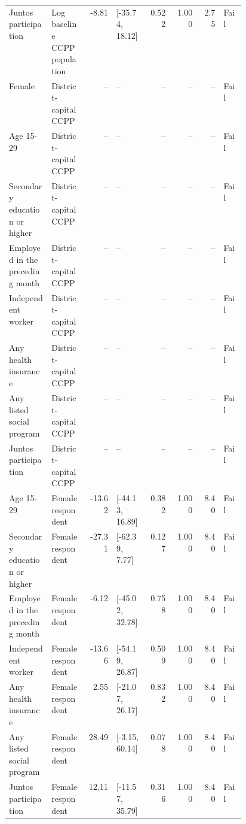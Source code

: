 \begin{longtable}{@{}p{0.18\linewidth}p{0.15\linewidth}rp{0.13\linewidth}rrrl@{}}
Juntos participation & Log baseline CCPP population & -8.81 & [-35.74, 18.12] & 0.522 & 1.000 & 2.75 & Fail \\
Female & District-capital CCPP & -- & -- & -- & -- & -- & Fail \\
Age 15-29 & District-capital CCPP & -- & -- & -- & -- & -- & Fail \\
Secondary education or higher & District-capital CCPP & -- & -- & -- & -- & -- & Fail \\
Employed in the preceding month & District-capital CCPP & -- & -- & -- & -- & -- & Fail \\
Independent worker & District-capital CCPP & -- & -- & -- & -- & -- & Fail \\
Any health insurance & District-capital CCPP & -- & -- & -- & -- & -- & Fail \\
Any listed social program & District-capital CCPP & -- & -- & -- & -- & -- & Fail \\
Juntos participation & District-capital CCPP & -- & -- & -- & -- & -- & Fail \\
Age 15-29 & Female respondent & -13.62 & [-44.13, 16.89] & 0.382 & 1.000 & 8.40 & Fail \\
Secondary education or higher & Female respondent & -27.31 & [-62.39, 7.77] & 0.127 & 1.000 & 8.40 & Fail \\
Employed in the preceding month & Female respondent & -6.12 & [-45.02, 32.78] & 0.758 & 1.000 & 8.40 & Fail \\
Independent worker & Female respondent & -13.66 & [-54.19, 26.87] & 0.509 & 1.000 & 8.40 & Fail \\
Any health insurance & Female respondent & 2.55 & [-21.07, 26.17] & 0.832 & 1.000 & 8.40 & Fail \\
Any listed social program & Female respondent & 28.49 & [-3.15, 60.14] & 0.078 & 1.000 & 8.40 & Fail \\
Juntos participation & Female respondent & 12.11 & [-11.57, 35.79] & 0.316 & 1.000 & 8.40 & Fail \\
\end{longtable}
\endgroup

